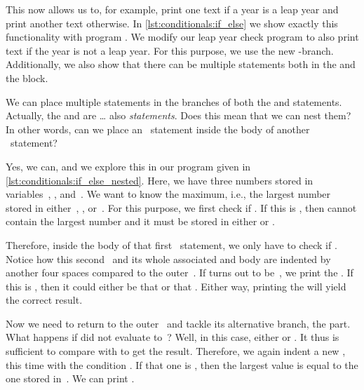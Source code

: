 This now allows us to, for example, print one text if a year is a leap year and print another text otherwise.
In \cref{lst:conditionals:if_else} we show exactly this functionality with program .
We modify our leap year check program to also print text if the year is not a leap year.
For this purpose, we use the new \nobreakdashes-branch.
Additionally, we also show that there can be multiple statements both in the  and the  block.

We can place multiple statements in the branches of both the  and  statements.
Actually, the  and  are {\dots} also \emph{statements}.
Does this mean that we can nest them?
In other words, can we place an ~statement inside the body of another ~statement?

Yes, we can, and we explore this in our program  given in \cref{lst:conditionals:if_else_nested}.
Here, we have three numbers stored in variables~, , and~.
We want to know the maximum, i.e., the largest number stored in either~, , or~.
For this purpose, we first check if \pythonIdx{>}.
If this is , then  cannot contain the largest number and it must be stored in either  or .

Therefore, inside the body of that first ~statement, we only have to check if .
Notice how this second~ and its whole associated  and body are indented by another four spaces compared to the outer~.
If  turns out to be~, we print the  .
If this is , then it could either be that  or that .
Either way, printing the   will yield the correct result.

Now we need to return to the outer~ and tackle its alternative branch, the  part.
What happens if  did not evaluate to~?
Well, in this case, either  or .
It thus is sufficient to compare  with  to get the result.
Therefore, we again indent a new , this time with the condition .
If that one is , then the largest value is equal to the one stored in~.
We can print .

